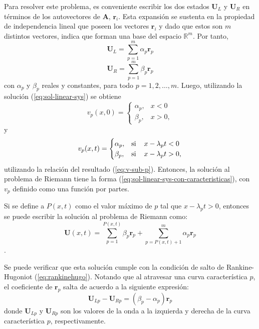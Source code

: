 Para resolver este problema, es conveniente escribir los dos estados $\mathbf{U}_L$ y  $\mathbf{U}_R$ en términos de los autovectores de $\mathbf{A}$, $\mathbf{r}_i$. Esta expansión se sustenta en la propiedad de independencia lineal que poseen los vectores $\mathbf{r}_i$ y dado que estos son $m$ distintos vectores,  indica que forman una base del espacio $\mathbb{R}^{m}$. Por tanto,
\begin{equation}
	\mathbf{U}_L = \sum_{p=1}^{m} \alpha_{p} \mathbf{r}_{p}
\end{equation}
\begin{equation}
	\mathbf{U}_R = \sum_{p=1}^{m} \beta_{p} \mathbf{r}_{p}
\end{equation}
con $\alpha_p$ y $\beta_{p}$ reales y constantes, para todo $p=1,2,\dots, m$.
Luego, utilizando la solución (\ref{eq:sol-linear-sys}) se obtiene
\begin{equation}
	v_p(x,0) = 
	\begin{cases}
		\alpha_p, & x < 0 \\
		\beta_{p}, & x > 0,
	\end{cases}
\end{equation}
y
\begin{equation}
	v_p(x,t) = 
	\begin{cases}
		\alpha_p, & \text{si} \hspace{4mm} x - \lambda_{p} t < 0 \\
		\beta_{p}, & \text{si} \hspace{4mm} x - \lambda_{p} t > 0,
	\end{cases}
\end{equation}
utilizando la relación del resultado (\ref{eq:v-sub-p}). Entonces, la solución al problema de Riemann tiene la forma (\ref{eq:sol-linear-sys-con-caracteristicas}), con $v_p$ definido como una función por partes.

Si se define a $P(x,t)$ como el valor máximo de $p$ tal que $x - \lambda_{p} t > 0$, entonces se puede escribir la solución al problema de Riemann como:
\begin{equation}
	\mathbf{U}(x,t) = \sum_{p=1}^{P(x,t)}\beta_{p}\mathbf{r}_{p} + \sum_{p=P(x,t) +1}^{m} \alpha_{p} \mathbf{r}_p
	\label{eq:sol-riemann-linear-sys-1}
\end{equation}.

Se puede verificar que esta solución cumple con la condición de salto de Rankine-Hugoniot (\ref{eq:rankinehugo}). Notando que al atravesar una curva característica $p$, el coeficiente de $\mathbf{r}_p$ salta de acuerdo a la siguiente expresión:
\begin{equation}
	\mathbf{U}_{Lp} - \mathbf{U}_{Rp} = (\beta_{p} - \alpha_{p})\mathbf{r}_p
\end{equation}
donde $\mathbf{U}_{Lp}$ y $\mathbf{U}_{Rp}$ son los valores de la onda a la izquierda y derecha de la curva característica $p$, respectivamente.

